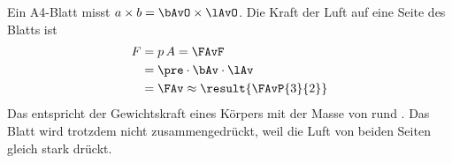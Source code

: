 Ein A4-Blatt misst $a\times b = \bAvO \times \lAvO$. Die Kraft der Luft auf eine Seite des Blatts ist
\begin{align}
 F &= p\,A = \FAvF \\
   &= \pre\cdot\bAv\cdot\lAv \\
   &= \FAv \approx \result{\FAvP{3}{2}}
\end{align}
Das entspricht der Gewichtskraft eines Körpers mit der Masse von rund . Das Blatt wird trotzdem nicht zusammengedrückt, weil die Luft von beiden Seiten gleich stark drückt.
